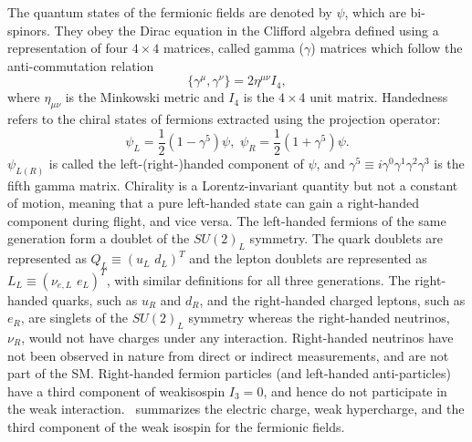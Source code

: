 The quantum states of the fermionic fields are denoted by $\psi$, which are bi-spinors. They obey the Dirac equation in the Clifford algebra defined using a representation of four $4\times4$ matrices, called gamma ($\gamma$) matrices which follow the anti-commutation relation 
\begin{equation}
    \{\gamma^\mu, \gamma^\nu\}=2\eta^{\mu\nu}I_4,
\end{equation}
where $\eta_{\mu\nu}$ is the Minkowski metric and $I_4$ is the $4\times4$ unit matrix. Handedness refers to the chiral states of fermions extracted using the projection operator:
\begin{equation}
    \psi_L=\frac{1}{2}(1-\gamma^5)\psi,\,\, \psi_R=\frac{1}{2}(1+\gamma^5)\psi.
\end{equation}
$\psi_{L(R)}$ is called the left-(right-)handed component of $\psi$, and $\gamma^5\equiv i\gamma^0\gamma^1\gamma^2\gamma^3$ is the fifth gamma matrix. Chirality is a Lorentz-invariant quantity but not a constant of motion, meaning that a pure left-handed state can gain a right-handed component during flight, and vice versa. The left-handed fermions of the same generation form a doublet of the $SU(2)_L$ symmetry. The quark doublets are represented as $Q_L\equiv (u_L\,\, d_L)^T$ and the lepton doublets are represented as $L_L \equiv (\nu_{e,L}\,\, e_L)^T$, with similar definitions for all three generations. The right-handed quarks, such as $u_R$ and $d_R$, and the right-handed charged leptons, such as $e_R$, are singlets of the $SU(2)_L$ symmetry whereas the right-handed neutrinos, $\nu_R$, would not have charges under any interaction. Right-handed neutrinos have not been observed in nature from direct or indirect measurements, and are not part of the SM. Right-handed fermion particles (and left-handed anti-particles) have a third component of weakisospin $I_3=0$, and hence do not participate in the weak interaction.~ summarizes the electric charge, weak hypercharge, and the third component of the weak isospin for the fermionic fields.

